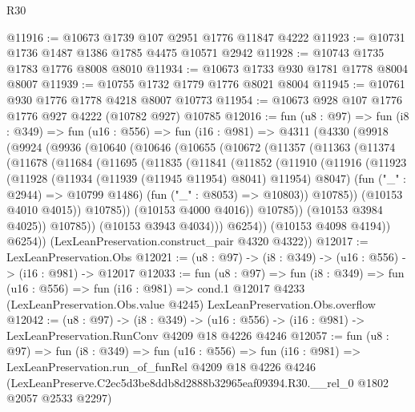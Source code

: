 \begin{lexlean}{R30}
\begin{coremodule}
@11916 := @10673 @1739 @107 @2951 @1776 @11847 @4222
@11923 := @10731 @1736 @1487 @1386 @1785 @4475 @10571 @2942
@11928 := @10743 @1735 @1783 @1776 @8008 @8010
@11934 := @10673 @1733 @930 @1781 @1778 @8004 @8007
@11939 := @10755 @1732 @1779 @1776 @8021 @8004
@11945 := @10761 @930 @1776 @1778 @4218 @8007 @10773
@11954 := @10673 @928 @107 @1776 @1776 @927 @4222 (@10782 @927) @10785
@12016 := fun (u8 : @97) =>
  fun (i8 : @349) =>
  fun (u16 : @556) =>
  fun (i16 : @981) =>
  @4311
    (@4330
      (@9918
        (@9924
          (@9936
            (@10640
              (@10646
                (@10655
                  (@10672
                    (@11357
                      (@11363
                        (@11374
                          (@11678
                            (@11684
                              (@11695
                                (@11835
                                  (@11841
                                    (@11852
                                      (@11910
                                        (@11916
                                          (@11923
                                            (@11928
                                              (@11934 (@11939 (@11945 @11954) @8041) @11954)
                                              @8047)
                                            (fun ("_" : @2944) => @10799 @1486)
                                            (fun ("_" : @8053) => @10803))
                                          @10785))
                                      (@10153 @4010 @4015))
                                    @10785))
                                (@10153 @4000 @4016))
                              @10785))
                          (@10153 @3984 @4025))
                        @10785))
                    (@10153 @3943 @4034)))
                @6254))
            (@10153 @4098 @4194))
          @6254))
      (LexLeanPreservation.construct_pair @4320 @4322))
@12017 := LexLeanPreservation.Obs
@12021 := (u8 : @97) -> (i8 : @349) -> (u16 : @556) -> (i16 : @981) -> @12017
@12033 := fun (u8 : @97) =>
  fun (i8 : @349) =>
  fun (u16 : @556) =>
  fun (i16 : @981) =>
  cond.{1} @12017 @4233 (LexLeanPreservation.Obs.value @4245) LexLeanPreservation.Obs.overflow
@12042 := (u8 : @97) ->
  (i8 : @349) -> (u16 : @556) -> (i16 : @981) -> LexLeanPreservation.RunConv @4209 @18 @4226 @4246
@12057 := fun (u8 : @97) =>
  fun (i8 : @349) =>
  fun (u16 : @556) =>
  fun (i16 : @981) =>
  LexLeanPreservation.run_of_funRel
    @4209
    @18
    @4226
    @4246
    (LexLeanPreserve.C2ec5d3be8ddb8d2888b32965eaf09394.R30.__rel_0 @1802 @2057 @2533 @2297)
\end{coremodule}
\end{lexlean}
